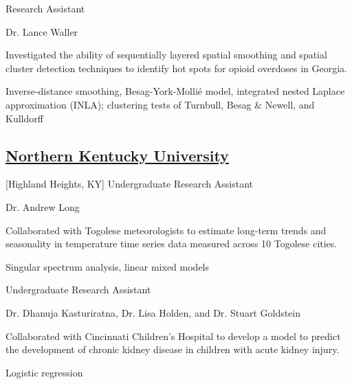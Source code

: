 Research Assistant \hfill {} \\
    \begin{description}[leftmargin=!,labelwidth=1.0em,labelindent=1.0em]
    \item[Advisor:] Dr. Lance Waller
    \item[Description:] Investigated the ability of sequentially layered spatial smoothing and spatial cluster detection techniques to identify hot spots for opioid overdoses in Georgia.
    \item[Methods:] Inverse-distance smoothing, Besag-York-Mollié model, integrated nested Laplace approximation (INLA); clustering tests of Turnbull, Besag \& Newell, and Kulldorff
    \end{description}

\subsection{\href{https://www.nku.edu}{Northern Kentucky University}}[Highland Heights, KY]
\vspace{-\parskip}
Undergraduate Research Assistant \hfill {} \\
    \begin{description}[leftmargin=!,labelwidth=1.0em,labelindent=1.0em]
    \item[Advisor:] Dr. Andrew Long
    \item[Description:] Collaborated with Togolese meteorologists to estimate long-term trends and seasonality in temperature time series data measured across 10 Togolese cities.
    \item[Methods:] Singular spectrum analysis, linear mixed models
    \end{description}
    
Undergraduate Research Assistant \hfill {} \\
    \begin{description}[leftmargin=!,labelwidth=1.0em,labelindent=1.0em]
    \item[Advisors:] Dr. Dhanuja Kasturiratna, Dr. Lisa Holden, and Dr. Stuart Goldstein
    \item[Description:] Collaborated with Cincinnati Children’s Hospital to develop a model to predict the development of chronic kidney disease in children with acute kidney injury.
    \item[Methods:] Logistic regression
    \end{description}


    